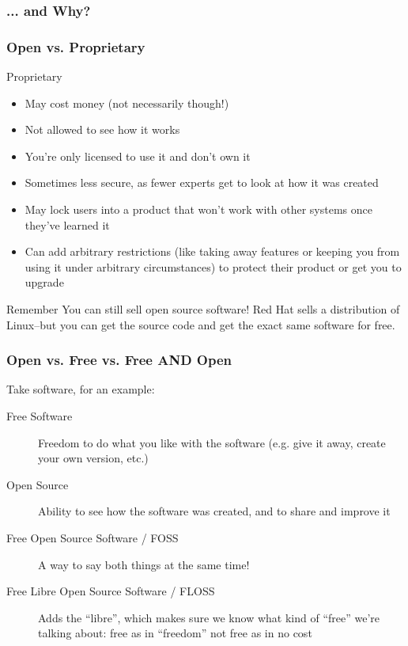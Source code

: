 \documentclass{beamer}
\begin{document}
\begin{frame}
  \frametitle{... and Why?}
\end{frame}

\begin{frame}
  \frametitle{Open vs. Proprietary}
  
  Proprietary
  \begin{itemize}
  \item May cost \textcolor{beamer@mygreen}{money} (not necessarily though!)
  \item \textcolor{beamer@mygreen}{Not} allowed to see how it works
  \item You're only \textcolor{beamer@mygreen}{licensed} to use it and don't own it
  \item Sometimes less \textcolor{beamer@mygreen}{secure}, as fewer experts get to look at how it was created
  \item May \textcolor{beamer@mygreen}{lock} users into a product that won't work with other systems once they've learned it
  \item Can add arbitrary \textcolor{beamer@mygreen}{restrictions} (like taking away features or keeping you from using it under arbitrary circumstances) to protect their product or get you to upgrade
  \end{itemize}

  \begin{block}{Remember}
    You can still sell open source software! Red Hat sells a distribution of Linux--but you can get the source code and get the exact same software for free.
  \end{block}

\end{frame}

\begin{frame}
  \frametitle{Open vs. Free vs. Free AND Open}

  Take software, for an example: 

  \begin{description}
  \item[Free Software] Freedom to do what you like with the software (e.g. give it away, create your own version, etc.)
  \item[Open Source] Ability to see how the software was created, and to share and improve it
  \item[Free Open Source Software / FOSS] A way to say both things at the same time!
  \item[Free Libre Open Source Software / FLOSS] Adds the ``libre'', which makes sure we know what kind of ``free'' we're talking about: free as in ``freedom'' not free as in no cost
  \end{description}

\end{frame}
\end{document}
